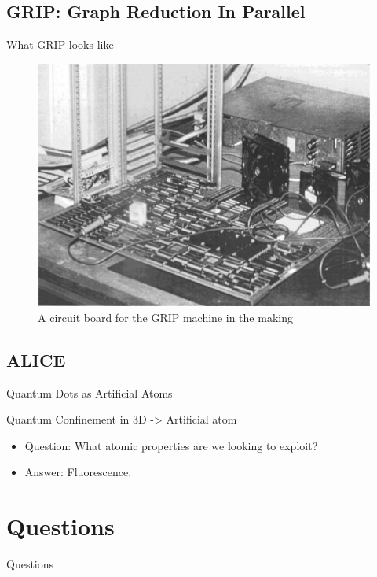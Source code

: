 \documentclass{beamer}
\begin{document}
\subsection[GRIP]{GRIP: Graph Reduction In Parallel}
\begin{frame}[fragile]{What GRIP looks like}{}

\begin{figure}[h]
 \centering
 \includegraphics[scale=.4]{figures/GRIP.png}
 \caption{A circuit board for the GRIP machine in the making \cite{PFPAnIntro}}
\end{figure}
\end{frame}

\subsection[ALICE]{ALICE}

\begin{frame}{Quantum Dots as Artificial Atoms}{}

  Quantum Confinement in 3D -> Artificial atom
  \begin{itemize}
  \item
   Question: What atomic properties are we looking to exploit?
   \pause
  \item
    Answer: Fluorescence.
  \end{itemize}
\end{frame}


\section*{Questions}

\begin{frame}
\centering
Questions
\end{frame}
\begin{frame}


\end{frame}
\end{document}
